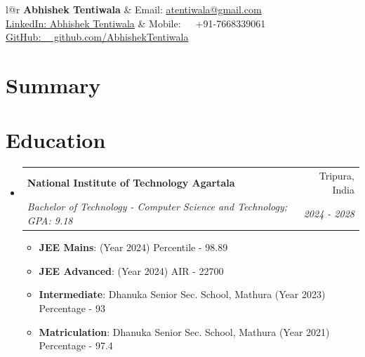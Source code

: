 \documentclass[a4paper,20pt]{article}
\makeatletter
\newcommand{\resumeItem}[2]{
  \item\small{
    \textbf{#1}{: #2 \vspace{-2pt}}
  }
}
\newcommand{\resumeSubheading}[4]{
  \vspace{-1pt}\item
    \begin{tabular*}{0.97\textwidth}{l@{\extracolsep{\fill}}r}
      \textbf{#1} & #2 \\
      \textit{#3} & \textit{#4} \\
    \end{tabular*}\vspace{-5pt}
}
\newcommand{\resumeSubHeadingListStart}{\begin{itemize}[leftmargin=*]}
\newcommand{\resumeSubHeadingListEnd}{\end{itemize}}
\newcommand{\resumeItemListStart}{\begin{itemize}}
\newcommand{\resumeItemListEnd}{\end{itemize}\vspace{-5pt}}
\makeatother
\begin{document}
\begin{tabular*}{\textwidth}{l@{\extracolsep{\fill}}r}
  \textbf{{\LARGE Abhishek Tentiwala}} & Email: \href{mailto:atentiwala@gmail.com}{atentiwala@gmail.com}\\
  \href{https://www.linkedin.com/in/abhishek-tentiwala-5bb781335?utm_source=share&utm_campaign=share_via&utm_content=profile&utm_medium=android_app}{LinkedIn: Abhishek Tentiwala} & Mobile:~~~+91-7668339061 \\
  \href{https://github.com/AbhishekTentiwala}{GitHub: ~~github.com/AbhishekTentiwala} \\
\end{tabular*}

\vspace{5pt}

\section{Summary}
\vspace{2pt}
\noindent\small{}
\vspace{2pt}
\vspace{-5pt}

\section{Education}
\resumeSubHeadingListStart
  \resumeSubheading
    {National Institute of Technology Agartala}{Tripura, India}
    {Bachelor of Technology - Computer Science and Technology; GPA: 9.18}{2024 - 2028}

  \resumeItemListStart
    \resumeItem{JEE Mains}{(Year 2024) Percentile - 98.89}
    \resumeItem{JEE Advanced}{(Year 2024) AIR - 22700}
    \resumeItem{Intermediate}{Dhanuka Senior Sec. School, Mathura (Year 2023) Percentage - 93}
    \resumeItem{Matriculation}{Dhanuka Senior Sec. School, Mathura (Year 2021) Percentage - 97.4}
  \resumeItemListEnd
\resumeSubHeadingListEnd
\end{document}

